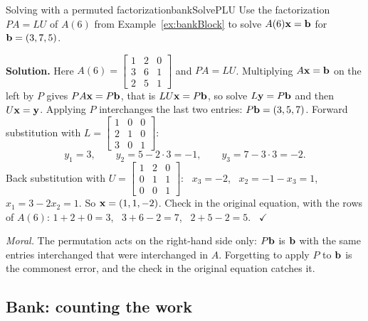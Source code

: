 \documentclass[11pt]{article}
\begin{document}
\begin{exmp}{Solving with a permuted factorization}{bankSolvePLU}
Use the factorization $PA=LU$ of $A(6)$ from Example~\ref{ex:bankBlock} to solve $A(6)\mathbf{x}=\mathbf{b}$ for $\mathbf{b}=(3,7,5)$.

\textbf{Solution.} Here $A(6)=\begin{bmatrix}1&2&0\\3&6&1\\2&5&1\end{bmatrix}$ and $PA=LU$. Multiplying $A\mathbf{x}=\mathbf{b}$ on the left by $P$ gives $PA\mathbf{x}=P\mathbf{b}$, that is $LU\mathbf{x}=P\mathbf{b}$, so solve $L\mathbf{y}=P\mathbf{b}$ and then $U\mathbf{x}=\mathbf{y}$. Applying $P$ interchanges the last two entries: $P\mathbf{b}=(3,5,7)$. Forward substitution with $L=\begin{bmatrix}1&0&0\\2&1&0\\3&0&1\end{bmatrix}$:
\[
y_1=3,\qquad y_2=5-2\cdot3=-1,\qquad y_3=7-3\cdot3=-2.
\]
Back substitution with $U=\begin{bmatrix}1&2&0\\0&1&1\\0&0&1\end{bmatrix}$: \ $x_3=-2$, \ $x_2=-1-x_3=1$, \ $x_1=3-2x_2=1$. So $\mathbf{x}=(1,1,-2)$. Check in the original equation, with the rows of $A(6)$: $1+2+0=3$, \ $3+6-2=7$, \ $2+5-2=5$. \ $\checkmark$

\emph{Moral.} The permutation acts on the right-hand side only: $P\mathbf{b}$ is $\mathbf{b}$ with the same entries interchanged that were interchanged in $A$. Forgetting to apply $P$ to $\mathbf{b}$ is the commonest error, and the check in the original equation catches it.
\end{exmp}

\subsection*{Bank: counting the work}
\end{document}
